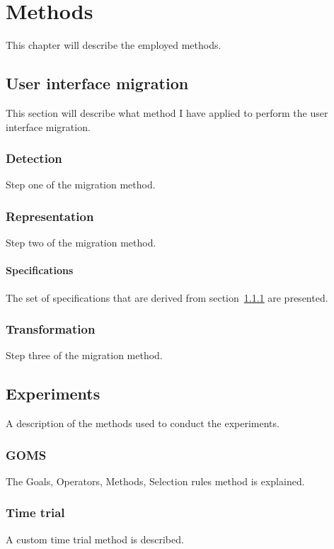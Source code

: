 \chapter{Methods}
\label{chapter:methods}
This chapter will describe the employed methods.

\section{User interface migration}
\label{section:userinterfacemigration}
This section will describe what method I have applied to perform the user interface migration.

\subsection{Detection}
\label{subsection:detection}
Step one of the migration method.

\subsection{Representation}
\label{subsection:representation}
Step two of the migration method.

\subsubsection{Specifications}
\label{subsubsection:specifications}
The set of specifications that are derived from section~\ref{subsection:detection} are presented.

\subsection{Transformation}
\label{subsection:transformation}
Step three of the migration method.

\section{Experiments}
\label{section:experiments_methods}
A description of the methods used to conduct the experiments.

\subsection{GOMS}
\label{subsection:goms_methods}
The Goals, Operators, Methods, Selection rules method is explained.

\subsection{Time trial}
\label{subsection:timetrial_methods}
A custom time trial method is described.